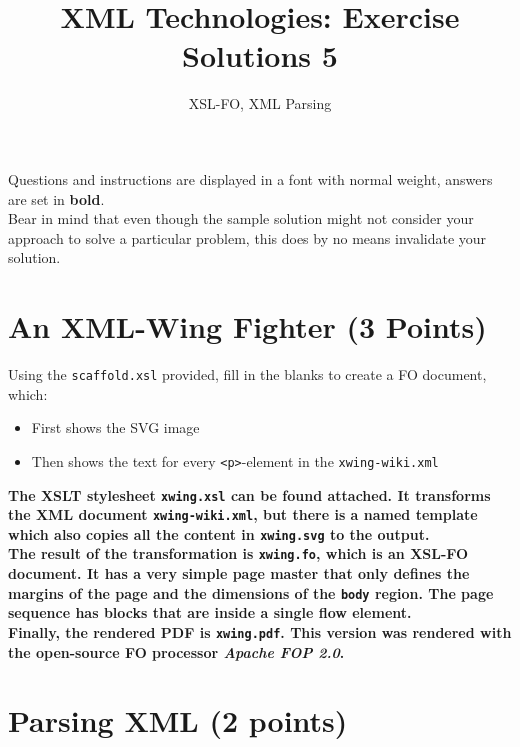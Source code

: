 \documentclass[a4paper, 12pt]{scrartcl}
\title{XML Technologies: Exercise Solutions 5}
\date{}
\subtitle{XSL-FO, XML Parsing}
\begin{document}
\maketitle\vspace{-5ex}

\noindent Questions and instructions are displayed in a font with normal weight, answers are set in \textbf{bold}. \\

\noindent Bear in mind that even though the sample solution might not consider your approach to solve a particular problem, this does by no means invalidate your solution. 

\section{An XML-Wing Fighter (3 Points)}

\noindent Using the \texttt{scaffold.xsl} provided, fill in the blanks to create a FO document, which:

\begin{itemize}
\item First shows the SVG image
\item Then shows the text for every \texttt{<p>}-element in the \texttt{xwing-wiki.xml}
\end{itemize}

\noindent \textbf{The XSLT stylesheet \texttt{xwing.xsl} can be found attached. It transforms the XML document \texttt{xwing-wiki.xml}, but there is a named template which also copies all the content in \texttt{xwing.svg} to the output.} \\

\noindent \textbf{The result of the transformation is \texttt{xwing.fo}, which is an XSL-FO document. It has a very simple page master that only defines the margins of the page and the dimensions of the \texttt{body} region. The page sequence has blocks that are inside a single flow element.} \\

\noindent \textbf{Finally, the rendered PDF is \texttt{xwing.pdf}. This version was rendered with the open-source FO processor \textit{Apache FOP 2.0}.}


\section{Parsing XML  (2 points)}
\end{document}
